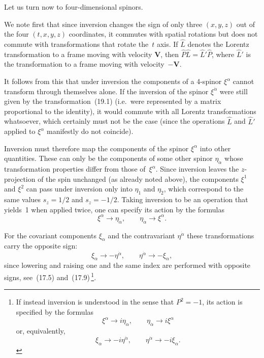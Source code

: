 Let us turn now to four-dimensional spinors.

We note first that since inversion changes the sign of only three $(x, y, z)$ out of the four $(t, x, y, z)$ coordinates, it commutes with spatial rotations but does not commute with transformations that rotate the~$t$ axis. If $\widehat L$ denotes the Lorentz transformation to a frame moving with velocity $\mathbf{V}$, then $\widehat P\widehat L = \widehat L'\widehat P$, where $\widehat L'$ is the transformation to a frame moving with velocity~$-\mathbf{V}$.

It follows from this that under inversion the components of a 4-spinor $\xi^\alpha$ cannot transform through themselves alone. If the inversion of the spinor $\xi^{\dot\alpha}$ were still given by the transformation~(19.1) (i.e.\ were represented by a matrix proportional to the identity), it would commute with all Lorentz transformations whatsoever, which certainly must not be the case (since the operations $\widehat L$ and $\widehat L'$ applied to $\xi^\alpha$ manifestly do not coincide).

Inversion must therefore map the components of the spinor $\xi^\alpha$ into other quantities. These can only be the components of some other spinor $\eta_{\dot\alpha}$ whose transformation properties differ from those of~$\xi^\alpha$. Since inversion leaves the $z$-projection of the spin unchanged (as already noted above), the components $\xi^1$ and $\xi^2$ can pass under inversion only into $\eta_{\dot 1}$ and $\eta_{\dot 2}$, which correspond to the same values $s_z = 1/2$ and $s_z = -1/2$. Taking inversion to be an operation that yields~1 when applied twice, one can specify its action by the formulas
\begin{equation}
\xi^\alpha \to \eta_{\dot\alpha},\qquad \eta_{\dot\alpha} \to \xi^\alpha.
\tag{19.4}
\end{equation}

For the covariant components $\xi_\alpha$ and the contravariant $\eta^{\dot\alpha}$ these transformations carry the opposite sign:
\begin{equation}
\xi_\alpha \to -\eta^{\dot\alpha},\qquad \eta^{\dot\alpha} \to -\xi_\alpha,
\tag{19.4a}
\end{equation}
since lowering and raising one and the same index are performed with opposite signs, see~(17.5) and~(17.9)\,\footnote{If instead inversion is understood in the sense that $P^2 = -1$, its action is specified by the formulas
\begin{equation}
\xi^\alpha \to i\eta_{\dot\alpha},\qquad \eta_{\dot\alpha} \to i\xi^\alpha
\tag{19.5}
\end{equation}
or, equivalently,
\begin{equation}
\xi_\alpha \to -i\eta^{\dot\alpha},\qquad \eta^{\dot\alpha} \to -i\xi_\alpha.
\tag{19.5a}
\end{equation}}.

